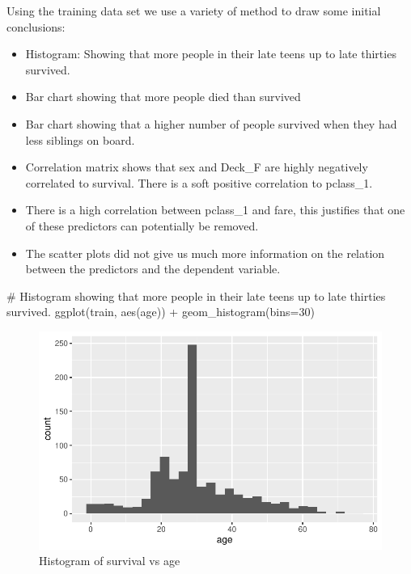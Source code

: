 \documentclass[
  letterpaper,
  DIV=11,
  numbers=noendperiod]{scrartcl}
\newenvironment{Shaded}{\begin{snugshade}}{\end{snugshade}}
\newcommand{\AttributeTok}[1]{\textcolor[rgb]{0.40,0.45,0.13}{#1}}
\newcommand{\CommentTok}[1]{\textcolor[rgb]{0.37,0.37,0.37}{#1}}
\newcommand{\DecValTok}[1]{\textcolor[rgb]{0.68,0.00,0.00}{#1}}
\newcommand{\FunctionTok}[1]{\textcolor[rgb]{0.28,0.35,0.67}{#1}}
\newcommand{\NormalTok}[1]{\textcolor[rgb]{0.00,0.23,0.31}{#1}}
\newcommand{\SpecialCharTok}[1]{\textcolor[rgb]{0.37,0.37,0.37}{#1}}
\providecommand{\tightlist}{%
  \setlength{\itemsep}{0pt}\setlength{\parskip}{0pt}}\usepackage{longtable,booktabs,array}
\begin{document}
Using the training data set we use a variety of method to draw some
initial conclusions:

\begin{itemize}
\tightlist
\item
  Histogram: Showing that more people in their late teens up to late
  thirties survived.
\item
  Bar chart showing that more people died than survived
\item
  Bar chart showing that a higher number of people survived when they
  had less siblings on board.
\item
  Correlation matrix shows that sex and Deck\_F are highly negatively
  correlated to survival. There is a soft positive correlation to
  pclass\_1.
\item
  There is a high correlation between pclass\_1 and fare, this justifies
  that one of these predictors can potentially be removed.
\item
  The scatter plots did not give us much more information on the
  relation between the predictors and the dependent variable.
\end{itemize}

\begin{Shaded}
\begin{Highlighting}[]
\CommentTok{\# Histogram showing that more people in their late teens up to late thirties survived.}
\FunctionTok{ggplot}\NormalTok{(train, }\FunctionTok{aes}\NormalTok{(age)) }\SpecialCharTok{+}
  \FunctionTok{geom\_histogram}\NormalTok{(}\AttributeTok{bins=}\DecValTok{30}\NormalTok{)}
\end{Highlighting}
\end{Shaded}

\begin{figure}[H]

{\centering \includegraphics{FinalProject_files/figure-pdf/unnamed-chunk-11-1.pdf}

}

\caption{Histogram of survival vs age}

\end{figure}%
\end{document}
